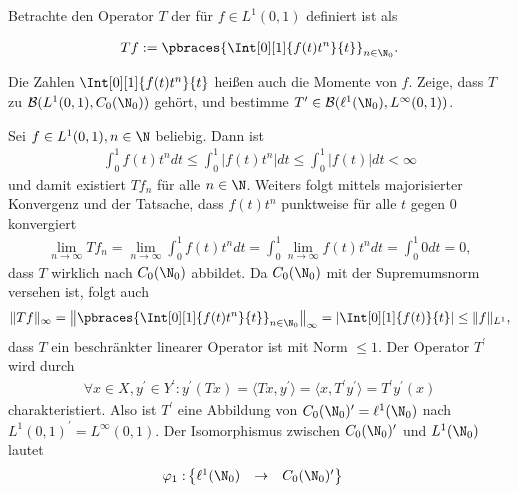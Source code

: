 \begin{exercise}[18/1]

Betrachte den Operator $T$ der für $f \in L^1(0, 1)$ definiert ist als

\begin{align*}
  T f
  :=
  \pbraces{\Int[0][1]{f(t) t^n}{t}}_{n \in \N_0}.
\end{align*}

Die Zahlen $\Int[0][1]{f(t) t^n}{t}$ heißen auch die Momente von $f$.
Zeige, dass $T$ zu $\mathcal{B}(L^1(0, 1), C_0(\N_0))$ gehört, und bestimme $T^\prime \in \mathcal{B}(\ell^1(\N_0), L^\infty(0, 1))$.

\end{exercise}

\begin{solution}
Sei $f \in L^1(0,1), n \in \N$ beliebig. Dann ist
\begin{align*}
  \int_0^1 f(t)t^n dt \leq   \int_0^1|f(t)t^n|dt \leq \int_0^1 |f(t)| dt < \infty
\end{align*}
und damit existiert $Tf_n$ für alle $n \in \N$. Weiters folgt mittels majorisierter
Konvergenz und der Tatsache, dass $f(t)t^n$ punktweise für alle $t$ gegen $0$ konvergiert
\begin{align*}
  \lim_{n \to \infty} Tf_n = \lim_{n \to \infty} \int_0^1 f(t)t^n dt
  =  \int_0^1 \lim_{n \to \infty}f(t)t^n dt = \int_0^1 0 dt= 0,
\end{align*}
dass $T$ wirklich nach $C_0(\N_0)$ abbildet. Da $C_0(\N_0)$ mit der Supremumsnorm
versehen ist, folgt auch
\begin{align*}
  \|Tf\|_{\infty} = \left\|\pbraces{\Int[0][1]{f(t) t^n}{t}}_{n \in \N_0}\right\|_{\infty} =
  \left|\Int[0][1]{f(t)}{t}\right| \leq \|f\|_{L^1},
\end{align*}
dass $T$ ein beschränkter linearer Operator ist mit Norm $\leq 1$.
Der Operator $T^{\prime}$ wird durch
\begin{align*}
  \forall x \in X, y^{\prime} \in Y^{\prime}:
  y^{\prime}(Tx) = \langle Tx,y^{\prime} \rangle =
  \langle x, T^{\prime}y^{\prime}\rangle = T^{\prime}y^{\prime}(x)
\end{align*}
charakteristiert. Also ist $T^{\prime}$ eine Abbildung von $C_0(\N_0)^{\prime} = \ell^1(\N_0)$
nach $L^1(0, 1)^{\prime} = L^\infty(0, 1)$.
Der Isomorphismus zwischen $C_0(\N_0)^{\prime}$ und $L^1(\N_0)$ lautet
\begin{align*}
  \varphi_1:& \begin{Bmatrix}
    \ell^1(\N_0) & \to & C_0(\N_0)^{\prime} \\

\end{Bmatrix}
\end{align*}
\end{solution}
